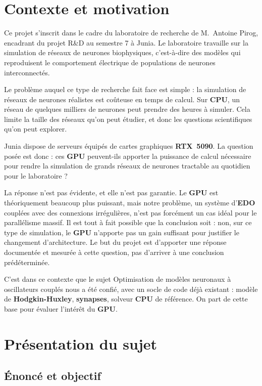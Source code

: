 \chapter{Contexte et motivation}

Ce projet s'inscrit dans le cadre du laboratoire de recherche de M.~Antoine Pirog, encadrant du projet R\&D au semestre 7 à Junia. Le laboratoire travaille sur la simulation de réseaux de neurones biophysiques, c'est-à-dire des modèles qui reproduisent le comportement électrique de populations de neurones interconnectés.

Le problème auquel ce type de recherche fait face est simple : la simulation de réseaux de neurones réalistes est coûteuse en temps de calcul. Sur \textbf{CPU}, un réseau de quelques milliers de neurones peut prendre des heures à simuler. Cela limite la taille des réseaux qu'on peut étudier, et donc les questions scientifiques qu'on peut explorer.

Junia dispose de serveurs équipés de cartes graphiques \textbf{RTX~5090}. La question posée est donc : ces \textbf{GPU} peuvent-ils apporter la puissance de calcul nécessaire pour rendre la simulation de grands réseaux de neurones tractable au quotidien pour le laboratoire ?

La réponse n'est pas évidente, et elle n'est pas garantie. Le \textbf{GPU} est théoriquement beaucoup plus puissant, mais notre problème, un système d'\textbf{EDO} couplées avec des connexions irrégulières, n'est pas forcément un cas idéal pour le parallélisme massif. Il est tout à fait possible que la conclusion soit : non, sur ce type de simulation, le \textbf{GPU} n'apporte pas un gain suffisant pour justifier le changement d'architecture. Le but du projet est d'apporter une réponse documentée et mesurée à cette question, pas d'arriver à une conclusion prédéterminée.

C'est dans ce contexte que le sujet \og Optimisation de modèles neuronaux à oscillateurs couplés \fg{} nous a été confié, avec un socle de code déjà existant : modèle de \textbf{Hodgkin-Huxley}, \textbf{synapses}, solveur \textbf{CPU} de référence. On part de cette base pour évaluer l'intérêt du \textbf{GPU}.

\chapter{Présentation du sujet}

\section{Énoncé et objectif}

